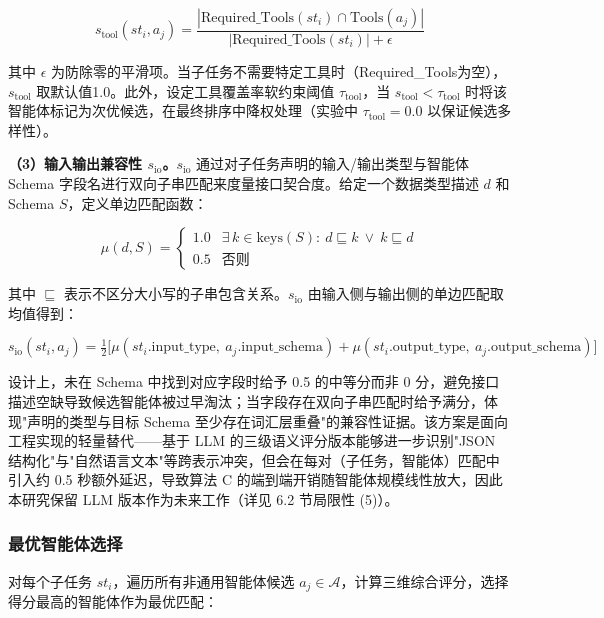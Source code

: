 \begin{equation}
s_{\text{tool}}(st_i, a_j) = \frac{|\text{Required\_Tools}(st_i) \cap \text{Tools}(a_j)|}{|\text{Required\_Tools}(st_i)| + \epsilon}
\end{equation}

其中 $\epsilon$ 为防除零的平滑项。当子任务不需要特定工具时（Required\_Tools为空），$s_{\text{tool}}$ 取默认值1.0。此外，设定工具覆盖率软约束阈值 $\tau_{\text{tool}}$，当 $s_{\text{tool}} < \tau_{\text{tool}}$ 时将该智能体标记为次优候选，在最终排序中降权处理（实验中 $\tau_{\text{tool}}=0.0$ 以保证候选多样性）。

\textbf{（3）输入输出兼容性 $s_{\text{io}}$。}$s_{\text{io}}$ 通过对子任务声明的输入/输出类型与智能体 Schema 字段名进行双向子串匹配来度量接口契合度。给定一个数据类型描述 $d$ 和 Schema $S$，定义单边匹配函数：

\begin{equation}
\mu(d, S) = \begin{cases}
1.0 & \exists\, k \in \mathrm{keys}(S):\ d \sqsubseteq k \ \lor\ k \sqsubseteq d \\
0.5 & \text{否则}
\end{cases}
\end{equation}

其中 $\sqsubseteq$ 表示不区分大小写的子串包含关系。$s_{\text{io}}$ 由输入侧与输出侧的单边匹配取均值得到：

\begin{equation}
s_{\text{io}}(st_i, a_j) = \tfrac{1}{2}\bigl[\mu(st_i.\text{input\_type},\ a_j.\text{input\_schema}) + \mu(st_i.\text{output\_type},\ a_j.\text{output\_schema})\bigr]
\end{equation}

设计上，未在 Schema 中找到对应字段时给予 0.5 的中等分而非 0 分，避免接口描述空缺导致候选智能体被过早淘汰；当字段存在双向子串匹配时给予满分，体现"声明的类型与目标 Schema 至少存在词汇层重叠"的兼容性证据。该方案是面向工程实现的轻量替代——基于 LLM 的三级语义评分版本能够进一步识别"JSON 结构化"与"自然语言文本"等跨表示冲突，但会在每对（子任务，智能体）匹配中引入约 0.5 秒额外延迟，导致算法 C 的端到端开销随智能体规模线性放大，因此本研究保留 LLM 版本作为未来工作（详见 6.2 节局限性 (5)）。

\subsubsection{最优智能体选择}

对每个子任务 $st_i$，遍历所有非通用智能体候选 $a_j \in \mathcal{A}$，计算三维综合评分，选择得分最高的智能体作为最优匹配：

